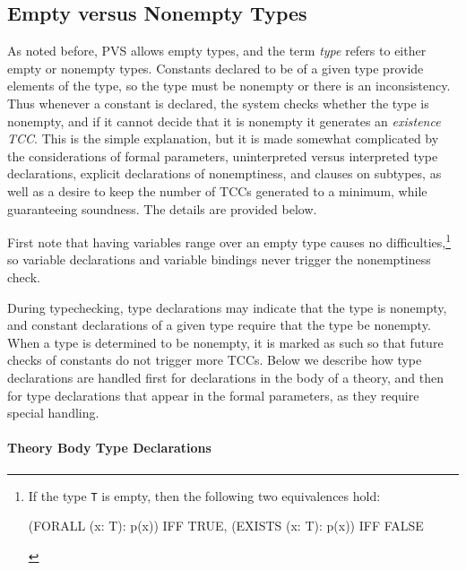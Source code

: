


\subsection{Empty versus Nonempty Types}
\label{emptytypes}

As noted before, PVS allows empty types, and the term \emph{type} refers
to either empty or nonempty types.  Constants declared to be of a given
type provide elements of the type, so the type must be nonempty or
there is an inconsistency.  Thus whenever a constant is declared, the
system checks whether the type is nonempty, and if it cannot decide that
it is nonempty it generates an \emph{existence TCC}. This is the simple explanation, but it is made
somewhat complicated by the considerations of formal parameters,
uninterpreted versus interpreted type declarations, explicit declarations
of nonemptiness, and  clauses on subtypes, as well as
a desire to keep the number of TCCs generated to a minimum, while
guaranteeing soundness.  The details are provided below.

First note that having variables range over an empty type causes no
difficulties,\footnote{If the type \texttt{T} is empty, then the following
two equivalences hold:
\begin{pvsex}
  (FORALL (x: T): p(x)) IFF TRUE, 
  (EXISTS (x: T): p(x)) IFF FALSE
\end{pvsex}}
so variable declarations and variable bindings never trigger the
nonemptiness check.

During typechecking, type declarations may indicate that the type is
nonempty, and constant declarations of a given type require that the type
be nonempty.  When a type is determined to be nonempty, it is marked as
such so that future checks of constants do not trigger more TCCs.  Below
we describe how type declarations are handled first for declarations in the
body of a theory, and then for type declarations that appear in the formal
parameters, as they require special handling.

\paragraph{Theory Body Type Declarations}

